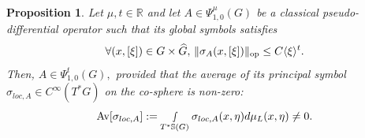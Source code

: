 \documentclass[12pt, reqno]{amsart}
\newtheorem{proposition}[theorem]{Proposition}
\theoremstyle{definition}
\theoremstyle{remark}
\numberwithin{equation}{section}
\begin{document}
\begin{proposition}\label{Toft:criterion}
    Let $\mu,t\in \mathbb{R}$ and let $A\in \Psi^{\mu}_{1,0}(G)$ be a classical pseudo-differential operator such that its global symbols satisfies
    \begin{equation}\label{growth:t2}
      \forall(x,[\xi])\in G\times \widehat{G},\,  \Vert \sigma_A(x,[\xi])\Vert_{\textnormal{op}}\leq C\langle\xi\rangle^{t}.
    \end{equation}Then, $A\in \Psi^{t}_{1,0}(G),$ provided that   the average of its principal symbol $\sigma_{loc,A}\in C^\infty(T^*G)$ on the co-sphere is non-zero:
\begin{equation}\label{Average:symbol:22:2}
    \textnormal{Av}[\sigma_{loc,A}]:=\smallint\limits_{ T^{*}\mathbb{S}(G)}\sigma_{loc,A}(x,\eta)d\mu_{L}(x,\eta)\neq 0.
\end{equation}
\end{proposition}
\end{document}
